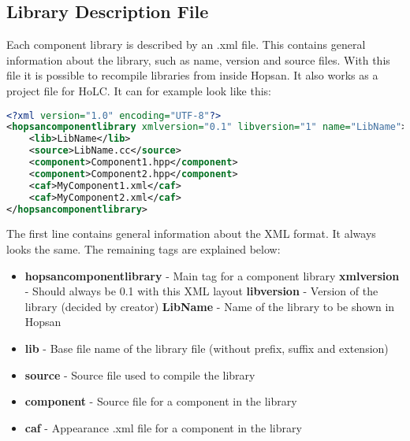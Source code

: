 \documentclass[a4paper,pdftex]{article}
\begin{document}
\subsection*{Library Description File}
Each component library is described by an .xml file.
This contains general information about the library, such as name, version and source files.
With this file it is possible to recompile libraries from inside Hopsan.
It also works as a project file for HoLC.
It can for example look like this:

\begin{minipage}{\linewidth}
\begin{lstlisting}[language=xml, basicstyle=\small\ttfamily]
<?xml version="1.0" encoding="UTF-8"?>
<hopsancomponentlibrary xmlversion="0.1" libversion="1" name="LibName">
    <lib>LibName</lib>
    <source>LibName.cc</source>
    <component>Component1.hpp</component>
    <component>Component2.hpp</component>
    <caf>MyComponent1.xml</caf>
    <caf>MyComponent2.xml</caf>
</hopsancomponentlibrary>
\end{lstlisting}
\end{minipage}

\noindent The first line contains general information about the XML format. It always looks the same. The remaining tags are explained below:

\begin{itemize}
\item \textbf{hopsancomponentlibrary} - Main tag for a component library
\subitem \textbf{xmlversion} - Should always be 0.1 with this XML layout
\subitem \textbf{libversion} - Version of the library (decided by creator)
\subitem \textbf{LibName} - Name of the library to be shown in Hopsan
\item \textbf{lib} - Base file name of the library file (without prefix, suffix and extension)
\item \textbf{source} - Source file used to compile the library
\item \textbf{component} - Source file for a component in the library
\item \textbf{caf} - Appearance .xml file for a component in the library
\end{itemize}
\end{document}
